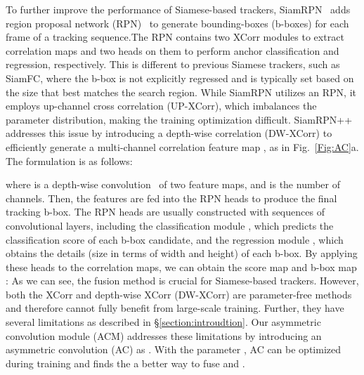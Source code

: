 \documentclass[10pt,twocolumn,letterpaper,final]{cvpr}
\begin{document}
To further improve the performance of Siamese-based trackers, SiamRPN~\cite{li2018high} adds region proposal network (RPN)~\cite{ren2015faster} to generate bounding-boxes (b-boxes) for each frame of a tracking sequence.The RPN contains two XCorr modules to extract correlation maps and two heads on them to perform anchor classification and regression, respectively. This is different to previous Siamese trackers, such as SiamFC, where the b-box is not explicitly regressed and is typically set based on the size that best matches the search region. While SiamRPN utilizes an RPN, it employs up-channel cross correlation (UP-XCorr), which imbalances the parameter distribution, making the training optimization difficult. SiamRPN++~\cite{li2019siamrpn} addresses this issue by introducing a depth-wise correlation (DW-XCorr) to efficiently generate a multi-channel correlation feature map , as in Fig.~\ref{Fig:AC}a. The formulation is as follows:


where  is a depth-wise convolution~\cite{howard2017mobilenets} of two feature maps, and  is the number of channels. Then, 
the features are fed into the RPN heads to produce the final tracking b-box. The RPN heads are usually constructed with sequences of  convolutional layers, including the classification module , which predicts the classification score of each b-box candidate, and the regression module , which obtains the details (size in terms of width and height) of each b-box. By applying these heads to the correlation maps, we can obtain the score map  and b-box map :
As we can see, the fusion method  is crucial for Siamese-based trackers. However, both the XCorr and depth-wise XCorr (DW-XCorr) are parameter-free methods and therefore cannot fully benefit from large-scale training. Further, they have several limitations as described in \S\ref{section:introudtion}. Our asymmetric convolution module (ACM) addresses these limitations by introducing an asymmetric convolution (AC) as . With the parameter , AC can be optimized during training and finds the a better way to fuse   and .
\end{document}

